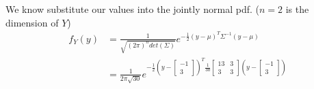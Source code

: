 \documentclass{article}
\begin{document}
We know substitute our values into the jointly normal pdf.
($n=2$ is the dimension of $Y$)
\begin{align*}
    f_Y(y) &= \frac{1}{\sqrt{(2\pi)^n det(\Sigma)}}
    e^{-\frac{1}{2} (y-\mu)^T \Sigma^{-1} (y-\mu)} \\
    &= \frac{1}{2\pi\sqrt{30}}
    e^{-\frac{1}{2} (y-\begin{bmatrix} -1 \\ 3 \end{bmatrix})^T
    \frac{1}{30}
    \begin{bmatrix}
        13 & 3 \\
        3 & 3
    \end{bmatrix} (y-\begin{bmatrix} -1 \\ 3 \end{bmatrix})} \\
\end{align*}
\end{document}
